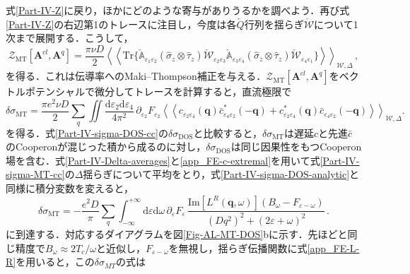 \documentclass[a4paper,11pt]{ltjsarticle}
\def\Tr{\mathrm{Tr}}
\def\d{\mathrm{d}}
\def\qo{(\mathbf{q},\omega)}
\begin{document}
式\eqref{Part-IV-Z}に戻り，ほかにどのような寄与がありうるかを調べよう．再び式\eqref{Part-IV-Z}の右辺第1のトレースに注目し，今度は各$\check{Q}$行列を揺らぎ$\check{\mathcal{W}}$について1次まで展開する．こうして，
\begin{equation}\label{Part-IV-Z-MT}
\mathcal{Z}_{\mathrm{MT}}[\mathbf{A}^{cl},\mathbf{A}^{q}]=\frac{\pi\nu
D}{2}\left\langle\left\langle\Tr\big\{\check{\mathbb{A}}_{\varepsilon_{1}\varepsilon_{2}}
(\hat{\sigma}_{z}\otimes\hat{\tau}_{z})
\check{\mathcal{W}}_{\varepsilon_{2}\varepsilon_{3}}
\check{\mathbb{A}}_{\varepsilon_{3}\varepsilon_{4}}
(\hat{\sigma}_{z}\otimes\hat{\tau}_{z})
\check{\mathcal{W}}_{\varepsilon_{4}\varepsilon_{1}}
\big\}\right\rangle\right\rangle_{\mathcal{W},\Delta}\,,
\end{equation}
を得る．これは伝導率へのMaki--Thompson補正を与える．$\mathcal{Z}_{\mathrm{MT}}[\mathbf{A}^{cl},\mathbf{A}^{q}]$をベクトルポテンシャルで微分してトレースを計算すると，直流極限で
\begin{equation}\label{Part-IV-sigma-MT-cc}
\delta\sigma_{\mathrm{MT}}=\frac{\pi e^2\nu D}{2}
\sum_{q}\iint\frac{\d\varepsilon_{2}\d\varepsilon_{4}}{4\pi^2}\,
\partial_{\varepsilon_{2}}F_{\varepsilon_{2}}
\left\langle\left\langle
c_{\varepsilon_{2}\varepsilon_{4}}(\mathbf{q})
\bar{c}^{*}_{\varepsilon_{4}\varepsilon_{2}}(-\mathbf{q})
+c^{*}_{\varepsilon_{2}\varepsilon_{4}}(\mathbf{q})
\bar{c}_{\varepsilon_{4}\varepsilon_{2}}(-\mathbf{q})
\right\rangle\right\rangle_{\mathcal{W},\Delta}.
\end{equation}
を得る．式\eqref{Part-IV-sigma-DOS-cc}の$\delta\sigma_{\mathrm{DOS}}$と比較すると，$\delta\sigma_{\mathrm{MT}}$は遅延$c$と先進$\bar{c}$のCooperonが混じった積から成るのに対し，$\delta\sigma_{\mathrm{DOS}}$は同じ因果性をもつCooperon場を含む．式\eqref{Part-IV-Delta-averages}と\eqref{app_FE-c-extremal}を用いて式\eqref{Part-IV-sigma-MT-cc}の$\Delta$揺らぎについて平均をとり，式\eqref{Part-IV-sigma-DOS-analytic}と同様に積分変数を変えると，
\begin{equation}\label{Part-IV-sigma-MT-analytic}
\delta\sigma_{\mathrm{MT}}=-\frac{e^{2}D}{\pi}\sum_{q}
\int^{+\infty}_{-\infty}\d\varepsilon\d\omega\,
\partial_{\varepsilon}F_{\varepsilon}\,\frac{\mathrm{Im}[L^{R}\qo]
(B_{\omega}-F_{\varepsilon-\omega})}
{(Dq^{2})^{2}+(2\varepsilon+\omega)^{2}} \,.
\end{equation}
に到達する．対応するダイアグラムを図\ref{Fig-AL-MT-DOS}bに示す．先ほどと同じ精度で$B_{\omega}\approx2T_{c}/\omega$と近似し，$F_{\varepsilon-\omega}$を無視し，揺らぎ伝播関数に式\eqref{app_FE-L-R}を用いると，この$\delta\sigma_{MT}$の式は
\end{document}
